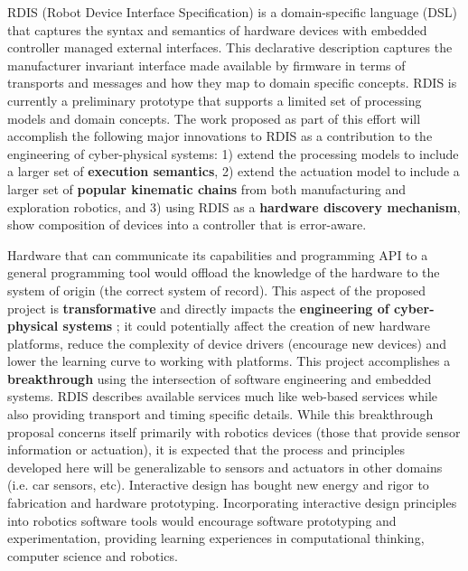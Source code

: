 RDIS (Robot Device Interface Specification) \cite{Anderson2012} is a domain-specific language (DSL) that captures the syntax and semantics of hardware devices with embedded controller managed external interfaces.  This declarative description captures the manufacturer invariant interface made available by firmware in terms of transports and messages and how they map to domain specific concepts.  RDIS is currently a preliminary prototype that supports a limited set of processing models and domain concepts.  The work proposed as part of this effort will accomplish the following major innovations to RDIS as a contribution to the engineering of cyber-physical systems: 1) extend the processing models to include a larger set of {\bf execution semantics}, 2) extend the actuation model to include a larger set of {\bf popular kinematic chains} from both manufacturing and exploration robotics, and 3) using RDIS as a {\bf hardware discovery mechanism}, show composition of devices into a controller that is error-aware.   

Hardware that can communicate its capabilities and programming API to a general programming tool would offload the knowledge of the hardware to the system of origin (the correct system of record).  This aspect of the proposed project is {\bf transformative} and directly impacts the {\bf engineering of cyber-physical systems} ; it could potentially affect the creation of new hardware platforms, reduce the complexity of device drivers (encourage new devices) and lower the learning curve to working with platforms.  This project accomplishes a {\bf breakthrough} using the intersection of software engineering and embedded systems.  RDIS describes available services much like web-based services while also providing transport and timing specific details.  While this breakthrough proposal concerns itself primarily with robotics devices (those that provide sensor information or actuation), it is expected that the process and principles developed here will be generalizable to sensors and actuators in other domains (i.e. car sensors, etc).  Interactive design has bought new energy and rigor to fabrication and hardware prototyping.  Incorporating interactive design principles into robotics software tools would encourage software prototyping and experimentation, providing learning experiences in computational thinking, computer science and robotics.  




